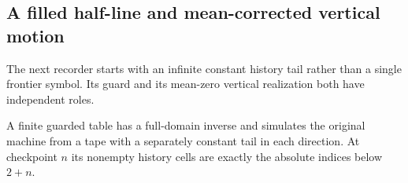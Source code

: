 \subsection{A filled half-line and mean-corrected vertical motion}
\label{bc:halfline-section}
The next recorder starts with an infinite constant history tail rather
than a single frontier symbol. Its guard and its mean-zero vertical
realization both have independent roles.

\begin{lemma}\label{bc:halfline-table}
A finite guarded table has a full-domain inverse and simulates the original
machine from a tape with a separately constant tail in each direction.
At checkpoint $n$ its nonempty history cells are exactly the absolute
indices below $2+n$.
\end{lemma}
